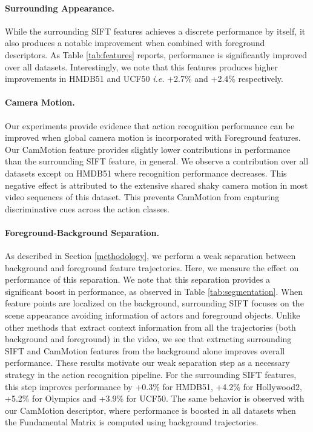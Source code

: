 \documentclass[runningheads]{llncs}
\begin{document}
\paragraph{Surrounding Appearance.} While the surrounding SIFT features achieves a discrete performance by itself, it also produces a notable improvement when combined with foreground descriptors. As Table \ref{tab:features} reports, performance is significantly improved over all datasets. Interestingly, we note that this features produces higher improvements in HMDB51 and UCF50 \emph{i.e.} +2.7\% and +2.4\% respectively.


\paragraph{Camera Motion.} Our experiments provide evidence that action recognition performance can be improved when global camera motion is incorporated with Foreground features. Our CamMotion feature provides slightly lower contributions in performance than the surrounding SIFT feature, in general. We observe a contribution over all datasets except on HMDB51 where recognition performance decreases. This negative effect is attributed to the extensive shared shaky camera motion in most video sequences of this dataset. This prevents CamMotion from capturing discriminative cues across the action classes.


\paragraph{Foreground-Background Separation.} As described in Section \ref{methodology}, we perform a weak separation between background and foreground feature trajectories. Here, we measure the effect on performance of this separation. We note that this separation provides a significant boost in performance, as observed in Table \ref{tab:segmentation}. When feature points are localized on the background, surrounding SIFT focuses on the scene appearance avoiding information of actors and foreground objects. Unlike other methods that extract context information from all the trajectories (both background and foreground) in the video, we see that extracting surrounding SIFT and CamMotion features from the background alone improves overall performance. These results motivate our weak separation step as a necessary strategy in the action recognition pipeline. For the surrounding SIFT features, this step improves performance by +0.3\% for HMDB51, +4.2\% for Hollywood2, +5.2\% for Olympics and +3.9\% for UCF50. The same behavior is observed with our CamMotion descriptor, where performance is boosted in all datasets when the Fundamental Matrix is computed using background trajectories.
\end{document}
